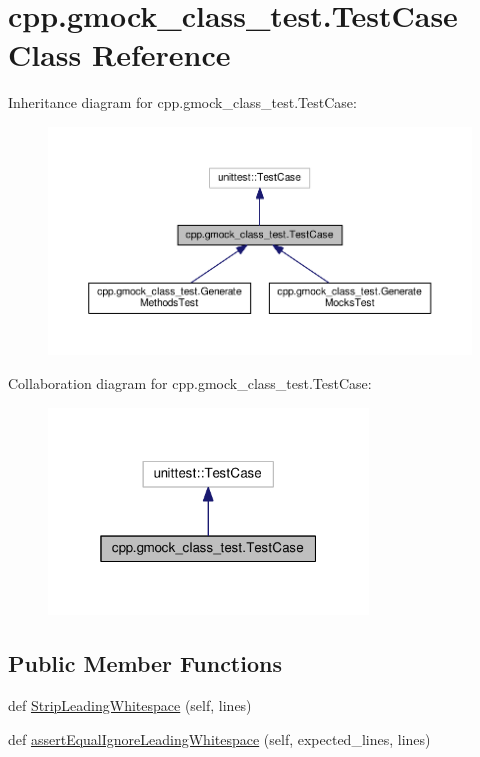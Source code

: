 \hypertarget{classcpp_1_1gmock__class__test_1_1TestCase}{}\section{cpp.\+gmock\+\_\+class\+\_\+test.\+Test\+Case Class Reference}
\label{classcpp_1_1gmock__class__test_1_1TestCase}


Inheritance diagram for cpp.\+gmock\+\_\+class\+\_\+test.\+Test\+Case\+:\nopagebreak
\begin{figure}[H]
\begin{center}
\leavevmode
\includegraphics[width=350pt]{classcpp_1_1gmock__class__test_1_1TestCase__inherit__graph}
\end{center}
\end{figure}


Collaboration diagram for cpp.\+gmock\+\_\+class\+\_\+test.\+Test\+Case\+:\nopagebreak
\begin{figure}[H]
\begin{center}
\leavevmode
\includegraphics[width=241pt]{classcpp_1_1gmock__class__test_1_1TestCase__coll__graph}
\end{center}
\end{figure}
\subsection*{Public Member Functions}
\begin{DoxyCompactItemize}
\item 
def \hyperlink{classcpp_1_1gmock__class__test_1_1TestCase_a366b15717eebc41e397357868c5734c5}{Strip\+Leading\+Whitespace} (self, lines)
\item 
def \hyperlink{classcpp_1_1gmock__class__test_1_1TestCase_a68f88bba11511f8c582123d47bf80464}{assert\+Equal\+Ignore\+Leading\+Whitespace} (self, expected\+\_\+lines, lines)
\end{DoxyCompactItemize}


